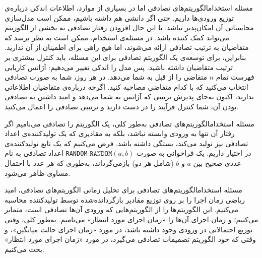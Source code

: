 \begin{itemframe-s}{مسئله استخدام}{الگوریتم‌های تصادفی}
\itm
اما در بسیاری از موارد، اطلاعات اندکی درباره‌ی توزیع ورودی‌ها داریم. حتی اگر دانشی هم داشته باشیم، ممکن است مدل‌سازی محاسباتی آن امکان‌پذیر نباشد.
با این حال افزودن رفتار تصادفی به بخشی از الگوریتم می‌تواند کمک کننده باشد.
\itm
در مسئله‌ی استخدام، ممکن است به نظر برسد که متقاضیان به ترتیب تصادفی ارائه می‌شوند، اما هیچ راهی برای اطمینان از آن ندارید. بنابراین، برای توسعه‌ی یک الگوریتم تصادفی برای این مسئله، باید کنترل بیشتری بر ترتیب متقاضیان داشته باشید.
\itm
پس مدل را اندکی تغییر می‌دهیم: آژانس کاریابی فهرست تمام $n$ متقاضی را از قبل به شما می‌دهد. در هر روز، شما به صورت تصادفی انتخاب می‌کنید که با کدام متقاضی مصاحبه کنید. اگرچه درباره‌ی متقاضیان اطلاعاتی ندارید، اکنون به‌جای پذیرش ترتیبی که آژانس به شما می‌دهد و امید داشتن به تصادفی بودن آن، شما کنترل فرآیند را در دست دارید و ترتیبی تصادفی را اعمال می‌کنید.

\end{itemframe-s}


\begin{itemframe-s}{مسئله استخدام}{الگوریتم‌های تصادفی}
\itm
به‌طور کلی، یک الگوریتم را تصادفی
می‌نامیم اگر رفتار آن تنها به ورودی وابسته نباشد، بلکه به مقادیری که یک تولیدکننده‌ی اعداد تصادفی
نیز تولید می‌کند، بستگی داشته باشد.
\itm
فرض می‌کنیم که یک تابع تولیدکننده‌ی اعداد تصادفی به نام
\texttt{RANDOM}
در اختیار داریم. یک فراخوانی به صورت
$\texttt{RANDOM}(a, b)$
عددی صحیح بین $a$ و $b$ (شامل هر دو) بازمی‌گرداند، به‌طوری که هر عدد با احتمال مساوی ظاهر می‌شود.
\end{itemframe-s}


\begin{itemframe-s}{مسئله استخدام}{الگوریتم‌های تصادفی}
\itm
برای تحلیل زمانی الگوریتم‌های تصادفی، امید ریاضی زمان اجرا را بر روی توزیع مقادیر بازگردانده‌شده توسط تولیدکننده محاسبه می‌کنیم.
\itm
این الگوریتم‌ها را از الگوریتم‌هایی که ورودی آن‌ها تصادفی است، متمایز می‌کنیم؛ و زمان اجرای آن‌ها را «زمان اجرای مورد انتظار»
می‌نامیم.
\itm
به‌طور کلی، وقتی توزیع احتمالاتی در ورودی‌ وجود داشته باشد، در مورد «زمان اجرای حالت میانگین»،
و وقتی که خود الگوریتم تصمیمات تصادفی می‌گیرد، در مورد «زمان اجرای مورد انتظار» بحث می‌کنیم.
\end{itemframe-s}